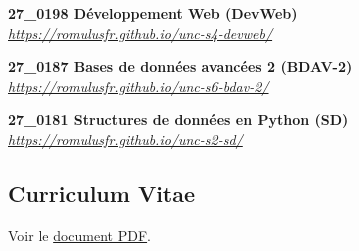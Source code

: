 \documentclass[12pt,a4paper]{article}
\newcommand{\activite}[1]{\textbf{#1}\xspace}
\newcommand{\comment}[1]{\textsl{#1}\xspace}
\newcommand{\INSAL}{\textsc{Insa de Lyon}\xspace}
\newcommand{\INRIARA}{\textsc{Inria Grenoble -- Rh\^one-Alpes}\xspace}
\newcommand{\UCBL}{\textsc{Universit{\'e} Claude Bernard Lyon 1}\xspace}
\newcommand{\UNC}{\textsc{Universit{\'e} de la Nouvelle-Calédonie}\xspace}
\newcommand{\ATER}{\textsc{ater}\xspace}
\begin{document}
     \activite{27\_0198 Développement Web (DevWeb)}\\
     \comment{\url{https://romulusfr.github.io/unc-s4-devweb/}} 

     \activite{27\_0187 Bases de données avancées 2 (BDAV-2)}\\
     \comment{\url{https://romulusfr.github.io/unc-s6-bdav-2/}}

     \activite{27\_0181 Structures de données en Python (SD)}\\
     \comment{\url{https://romulusfr.github.io/unc-s2-sd/}}
    

\subsection*{Curriculum Vitae} 

Voir le \href{https://perso.liris.cnrs.fr/rthion/files/THION_CV.pdf}{document PDF}.


    
    




\end{document}
